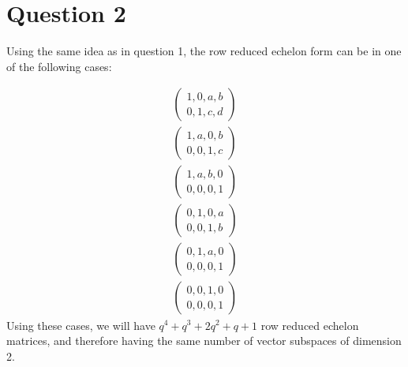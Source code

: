 \section*{Question 2}
Using the same idea as in question 1, the row reduced echelon form can be in one of the following cases:

\begin{eqnarray*}
  \left(
  \begin{array}{cccc}
  1, 0, a, b \\
  0, 1, c, d
  \end{array}
  \right) \\
  \left(
  \begin{array}{cccc}
  1, a, 0, b \\
  0, 0, 1, c
  \end{array}
  \right) \\
  \left(
  \begin{array}{cccc}
  1, a, b, 0 \\
  0, 0, 0, 1
  \end{array}
  \right) \\
  \left(
  \begin{array}{cccc}
  0, 1, 0, a \\
  0, 0, 1, b
  \end{array}
  \right) \\
  \left(
  \begin{array}{cccc}
  0, 1, a, 0 \\
  0, 0, 0, 1
  \end{array}
  \right) \\
  \left(
  \begin{array}{cccc}
  0, 0, 1, 0 \\
  0, 0, 0, 1
  \end{array}
  \right)
\end{eqnarray*}
Using these cases, we will have $ q^4 + q^3 + 2q^2 + q + 1 $ row reduced echelon matrices, and therefore having the same number of vector subspaces of dimension 2.